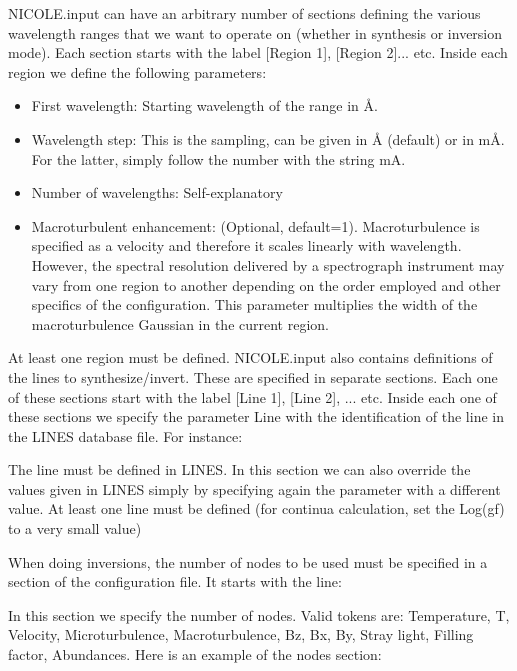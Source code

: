 NICOLE.input can have an arbitrary number of sections defining the
various wavelength ranges that we want to operate on (whether in
synthesis or inversion mode). Each section starts with the label
[Region 1], [Region 2]... etc. Inside each region we define the
following parameters:
\begin{itemize}
\item First wavelength: Starting wavelength of the range in \AA .
\item Wavelength step: This is the sampling, can be given in \AA
  (default) or in m\AA . For the latter, simply follow the number with
  the string mA. 
\item Number of wavelengths: Self-explanatory
\item Macroturbulent enhancement: (Optional,
  default=1). Macroturbulence is specified as a velocity and therefore
  it scales linearly with wavelength. However, the spectral resolution
  delivered by a spectrograph instrument may vary from one region to
  another depending on the order employed and other specifics of the
  configuration. This parameter multiplies the width of the
  macroturbulence Gaussian in the current region.
\end{itemize}

At least one region must be defined. NICOLE.input also contains
definitions of the lines to synthesize/invert. These are specified in
separate sections. Each one of these sections start with the label
[Line 1], [Line 2], ... etc. Inside each one of these sections we
specify the parameter Line with the identification of the line in the
LINES database file. For instance:

\vskip12pt
\vskip12pt

The line must be defined in LINES. In this section we can also
override the values given in LINES simply by specifying again the
parameter with a different value. At least one line must be defined
(for continua calculation, set the Log(gf) to a very small value)

When doing inversions, the number of nodes to be used must be
specified in a section of the configuration file. It starts with the
line:

\vskip12pt
\leftline{
[Nodes]}
\vskip12pt

In this section we specify the number of nodes. Valid tokens are:
Temperature, T, Velocity, Microturbulence,
Macroturbulence, Bz, Bx, By,
Stray light, Filling factor, Abundances.
Here is an example of the nodes section:

